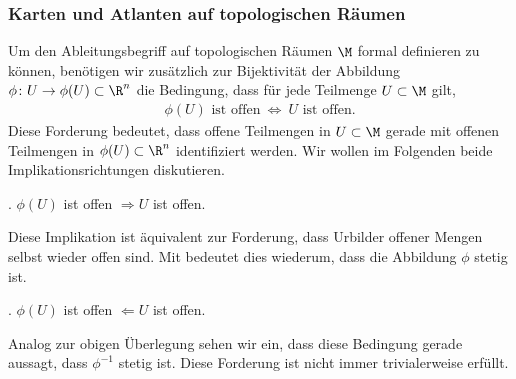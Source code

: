 \documentclass[letterpaper,10pt,english]{jupyterBook}
\begin{document}
\subsubsection{Karten und Atlanten auf topologischen Räumen}
\label{\detokenize{manifolds/manifolds_prelim:karten-und-atlanten-auf-topologischen-raumen}}
\sphinxAtStartPar
Um den Ableitungsbegriff auf topologischen Räumen \(\M\) formal definieren zu können, benötigen wir zusätzlich zur Bijektivität der Abbildung \(\phi \colon U \rightarrow \phi(U) \subset \R^n\) die Bedingung, dass für jede Teilmenge \(U \subset \M\) gilt,
\begin{equation*}
\begin{split}\phi(U)\text{ ist offen} \ \Leftrightarrow \ U \text{ ist offen}.\end{split}
\end{equation*}
\sphinxAtStartPar
Diese Forderung bedeutet, dass offene Teilmengen in \(U \subset \M\) gerade mit offenen Teilmengen in \(\phi(U) \subset \R^n\) identifiziert werden.
Wir wollen im Folgenden beide Implikationsrichtungen diskutieren.

. \(\phi(U)\) ist offen \(\Rightarrow U \) ist offen.

\sphinxAtStartPar
Diese Implikation ist äquivalent zur Forderung, dass Urbilder offener Mengen selbst wieder offen sind.
Mit {\hyperref[\detokenize{manifolds/manifolds_prelim:def:stetigkeitTopologie}]{}} bedeutet dies wiederum, dass die Abbildung \(\phi\) stetig ist.

. \(\phi(U)\) ist offen \(\Leftarrow U \) ist offen.

\sphinxAtStartPar
Analog zur obigen Überlegung sehen wir ein, dass diese Bedingung gerade aussagt, dass \(\phi^{-1}\) stetig ist.
Diese Forderung ist nicht immer trivialerweise erfüllt.
\end{document}
